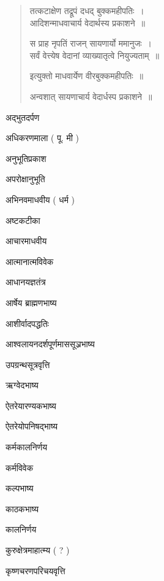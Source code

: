 \documentclass[11pt, openany]{book}
\begin{document}
\begin{multicols}{2}
\begin{quote}
{तत्कटाक्षेण तद्रूपं दधद् बुक्कमहीपतिः~।\\
आदिशन्माधवाचार्य वेदार्थस्य प्रकाशने~॥

स प्राह नृपतिं राजन् सायणार्यो ममानुजः~।\\
सर्वं वेत्त्येष वेदानां व्याख्यातृत्वे नियुज्यताम्~॥

इत्युक्तो माधवार्येण वीरबुक्कमहीपतिः~॥

अन्वशात् सायणाचार्य वेदार्धस्प प्रकाशने~॥}
\end{quote}

अद्भुतदर्पण 

अधिकरणमाला ( पू. मी ) 

अनुभूतिप्रकाश 

अपरोक्षानुभूति 

अभिनवमाधवीय ( धर्म ) 

अष्टकटीका 

आचारमाधवीय 

आत्मानात्मविवेक 

आधानयज्ञतंत्र

आर्षेय ब्राह्मणभाष्य 

आशीर्वादपद्धतिः 

आश्वलायनदर्शपूर्णमाससूञ्रभाष्य 

उपग्रन्थसूत्रवृत्ति 

ऋग्वेदभाष्य 

ऐतरेयारण्यकभाष्य 

ऐतरेयोपनिषद्भाष्य 

कर्मकालनिर्णय 

कर्मविवेक 

कल्पभाष्य 

काठकभाष्य 

कालनिर्णय 

कुरुक्षेत्रमाहात्म्य ( ? ) 

कृष्णचरणपरिचयवृत्ति 
\end{multicols}

\newpage
\end{document}
